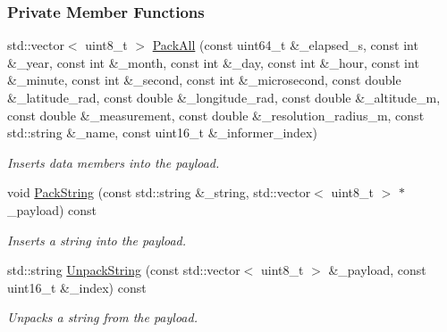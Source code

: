 \subsubsection*{Private Member Functions}
\begin{DoxyCompactItemize}
\item 
std\+::vector$<$ uint8\+\_\+t $>$ \hyperlink{classosse_1_1collaborate_1_1_packet_raw_a9f38c8bdbccf25e869a0d0dbf02c312a}{Pack\+All} (const uint64\+\_\+t \&\+\_\+elapsed\+\_\+s, const int \&\+\_\+year, const int \&\+\_\+month, const int \&\+\_\+day, const int \&\+\_\+hour, const int \&\+\_\+minute, const int \&\+\_\+second, const int \&\+\_\+microsecond, const double \&\+\_\+latitude\+\_\+rad, const double \&\+\_\+longitude\+\_\+rad, const double \&\+\_\+altitude\+\_\+m, const double \&\+\_\+measurement, const double \&\+\_\+resolution\+\_\+radius\+\_\+m, const std\+::string \&\+\_\+name, const uint16\+\_\+t \&\+\_\+informer\+\_\+index)
\begin{DoxyCompactList}\small\item\em Inserts data members into the payload. \end{DoxyCompactList}\item 
void \hyperlink{classosse_1_1collaborate_1_1_packet_raw_a0a3698124ebe1bb48f2cf3158035ea3d}{Pack\+String} (const std\+::string \&\+\_\+string, std\+::vector$<$ uint8\+\_\+t $>$ $\ast$\+\_\+payload) const
\begin{DoxyCompactList}\small\item\em Inserts a string into the payload. \end{DoxyCompactList}\item 
std\+::string \hyperlink{classosse_1_1collaborate_1_1_packet_raw_a852c9461111a6dff32bf1374d8bf27e0}{Unpack\+String} (const std\+::vector$<$ uint8\+\_\+t $>$ \&\+\_\+payload, const uint16\+\_\+t \&\+\_\+index) const
\begin{DoxyCompactList}\small\item\em Unpacks a string from the payload. \end{DoxyCompactList}\end{DoxyCompactItemize}
